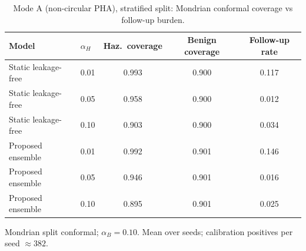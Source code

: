 \begin{table}[t]
\centering
\small
\caption{Mode A (non-circular PHA), stratified split: Mondrian conformal coverage vs follow-up burden.}
\label{tab:conf_pha_stratified}
\begin{tabular}{llccc}
\toprule
Model & $\alpha_H$ & Haz.\ coverage & Benign coverage & Follow-up rate \\
\midrule
Static leakage-free & 0.01 & 0.993 & 0.900 & 0.117 \\
Static leakage-free & 0.05 & 0.958 & 0.900 & 0.012 \\
Static leakage-free & 0.10 & 0.903 & 0.900 & 0.034 \\
\midrule
Proposed ensemble & 0.01 & 0.992 & 0.901 & 0.146 \\
Proposed ensemble & 0.05 & 0.946 & 0.901 & 0.016 \\
Proposed ensemble & 0.10 & 0.895 & 0.901 & 0.025 \\
\bottomrule
\end{tabular}
\par\vspace{2pt}\footnotesize Mondrian split conformal; $\alpha_B=0.10$. Mean over seeds; calibration positives per seed $\approx 382$.
\end{table}
